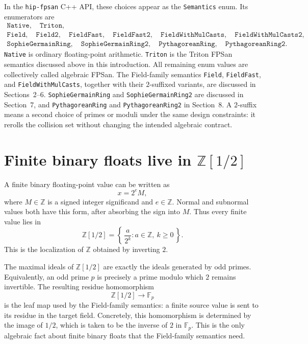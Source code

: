 \documentclass[11pt]{article}
\newcommand{\Z}{\mathbb{Z}}
\newcommand{\F}{\mathbb{F}}
\theoremstyle{plain}
\begin{document}
In the \texttt{hip-fpsan} C++ API, these choices appear as the
\texttt{Semantics} enum.  Its enumerators are
\[
\begin{gathered}
\texttt{Native},\quad
\texttt{Triton},\\
\texttt{Field},\quad
\texttt{Field2},\quad
\texttt{FieldFast},\quad
\texttt{FieldFast2},\quad
\texttt{FieldWithMulCasts},\quad
\texttt{FieldWithMulCasts2},\\
\texttt{SophieGermainRing},\quad
\texttt{SophieGermainRing2},\quad
\texttt{PythagoreanRing},\quad
\texttt{PythagoreanRing2}.
\end{gathered}
\]
\texttt{Native} is ordinary floating-point arithmetic.  \texttt{Triton} is the
Triton FPSan semantics discussed above in this introduction.  All remaining
enum values are collectively called algebraic FPSan.  The Field-family semantics
\texttt{Field}, \texttt{FieldFast}, and \texttt{FieldWithMulCasts}, together
with their \(2\)-suffixed variants, are discussed in Sections~2--6.
\texttt{SophieGermainRing} and \texttt{SophieGermainRing2} are discussed in
Section~7, and \texttt{PythagoreanRing} and \texttt{PythagoreanRing2} in
Section~8.  A \(2\)-suffix means a second choice of primes or moduli under the
same design constraints: it rerolls the collision set without changing the
intended algebraic contract.

\section{Finite binary floats live in \texorpdfstring{\(\Z[1/2]\)}{Z[1/2]}}

A finite binary floating-point value can be written as
\[
  x = 2^e M,
\]
where \(M\in\Z\) is a signed integer significand and \(e\in\Z\).  Normal and
subnormal values both have this form, after absorbing the sign into \(M\).  Thus
every finite value lies in
\[
  \Z[1/2] = \left\{\,\frac{a}{2^k}:a\in\Z,\ k\ge 0\,\right\}.
\]
This is the localization of \(\Z\) obtained by inverting \(2\).

The maximal ideals of \(\Z[1/2]\) are exactly the ideals generated by odd primes.
Equivalently, an odd prime \(p\) is precisely a prime modulo which \(2\) remains
invertible.  The resulting residue homomorphism
\[
  \Z[1/2]\longrightarrow\F_p
\]
is the leaf map used by the Field-family semantics: a finite source value is
sent to its residue in the target field.  Concretely, this homomorphism is
determined by the image of \(1/2\), which is taken to be the inverse of \(2\) in
\(\F_p\).  This is the only algebraic fact about finite binary floats that the
Field-family semantics need.
\end{document}
